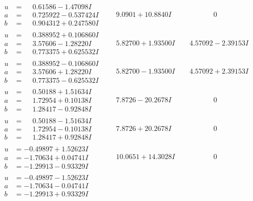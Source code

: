 \documentclass[1p]{elsarticle_modified}
\theoremstyle{definition}
\begin{document}
$$\begin{array}{c|c|c}
\begin{aligned}
u &= \phantom{-}0.61586 - 1.47098 I \\
a &= \phantom{-}0.725922 - 0.537424 I \\
b &= \phantom{-}0.904312 + 0.247580 I\end{aligned}
 & \phantom{-}9.0901 + 10.8840 I & \phantom{-0.000000 } 0 \\ \hline\begin{aligned}
u &= \phantom{-}0.388952 + 0.106860 I \\
a &= \phantom{-}3.57606 - 1.28220 I \\
b &= \phantom{-}0.773375 + 0.625532 I\end{aligned}
 & \phantom{-}5.82700 + 1.93500 I & \phantom{-}4.57092 - 2.39153 I \\ \hline\begin{aligned}
u &= \phantom{-}0.388952 - 0.106860 I \\
a &= \phantom{-}3.57606 + 1.28220 I \\
b &= \phantom{-}0.773375 - 0.625532 I\end{aligned}
 & \phantom{-}5.82700 - 1.93500 I & \phantom{-}4.57092 + 2.39153 I \\ \hline\begin{aligned}
u &= \phantom{-}0.50188 + 1.51634 I \\
a &= \phantom{-}1.72954 + 0.10138 I \\
b &= \phantom{-}1.28417 - 0.92848 I\end{aligned}
 & \phantom{-}7.8726 - 20.2678 I & \phantom{-0.000000 } 0 \\ \hline\begin{aligned}
u &= \phantom{-}0.50188 - 1.51634 I \\
a &= \phantom{-}1.72954 - 0.10138 I \\
b &= \phantom{-}1.28417 + 0.92848 I\end{aligned}
 & \phantom{-}7.8726 + 20.2678 I & \phantom{-0.000000 } 0 \\ \hline\begin{aligned}
u &= -0.49897 + 1.52623 I \\
a &= -1.70634 + 0.04741 I \\
b &= -1.29913 - 0.93329 I\end{aligned}
 & \phantom{-}10.0651 + 14.3028 I & \phantom{-0.000000 } 0 \\ \hline\begin{aligned}
u &= -0.49897 - 1.52623 I \\
a &= -1.70634 - 0.04741 I \\
b &= -1.29913 + 0.93329 I\end{aligned}

\end{array}$$
\end{document}
